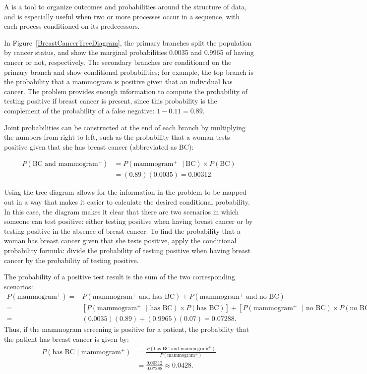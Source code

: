 A  is a tool to organize outcomes and probabilities around the structure of data, and is especially useful when two or more processes occur in a sequence, with each process  conditioned on its predecessors. 

In Figure~\ref{BreastCancerTreeDiagram}, the primary branches split the population by cancer status, and show the marginal probabilities 0.0035 and 0.9965 of having cancer or not, respectively. The secondary branches are conditioned on the primary branch and show conditional probabilities; for example, the top branch is the probability that a mammogram is positive given that an individual has cancer. The problem provides enough information to compute the probability of testing positive if breast cancer is present, since this probability is the complement of the probability of a false negative: $1 - 0.11 = 0.89$.

Joint probabilities can be constructed at the end of each branch by multiplying the numbers from right to left, such as the probability that a woman tests positive given that she has breast cancer (abbreviated as BC):

\begin{align*}
P(\text{BC and mammogram$^+$}) &= P(\text{mammogram$^+$ } |\ \text{BC}) \times  P(\text{BC}) \\
	&= (0.89) (0.0035) = 0.00312.
\end{align*}

\textD{\newpage}

Using the tree diagram allows for the information in the problem to be mapped out in a way that makes it easier to calculate the desired conditional probability. In this case, the diagram makes it clear that there are two scenarios in which someone can test positive: either testing positive when having breast cancer or by testing positive in the absence of breast cancer. To find the probability that a woman has breast cancer given that she tests positive, apply the conditional probability formula: divide the probability of testing positive when having breast cancer by the probability of testing positive.

The probability of a positive test result is the sum of the two corresponding scenarios:
\begin{align*}
P(\text{mammogram$^+$}) =&  P(\text{mammogram$^+$ and has BC}) + P(\text{mammogram$^+$ and no BC}) \\
=&[P(\text{mammogram$^+$ } | \text{ has BC}) \times P(\text{has BC})] + [P(\text{mammogram$^+$ } | \text{ no BC}) \times P(\text{no BC})] \\
=& (0.0035)(0.89) + (0.9965)(0.07) = 0.07288.
\end{align*}
Thus, if the mammogram screening is positive for a patient, the probability that the patient has breast cancer is given by: 
\begin{align*}
P(\text{has BC } | \text{ mammogram$^+$})
	&= \frac{P(\text{has BC and mammogram$^+$})}{P(\text{mammogram$^+$})}\\
	&= \frac{0.00312}{0.07288} \approx 0.0428.
\end{align*}

